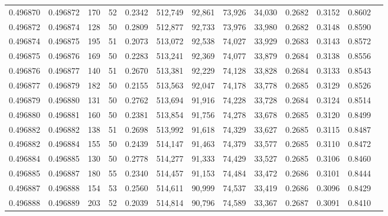 \begin{tabular}{rrrrrrrrrrrrr}
0.496870 & 0.496872 &   170 &  52 &                                     0.2342 & 512,749 &  92,861 &  73,926 &  34,030 & 0.2682 & 0.3152 & 0.8602 \\
0.496872 & 0.496874 &   128 &  50 &                                     0.2809 & 512,877 &  92,733 &  73,976 &  33,980 & 0.2682 & 0.3148 & 0.8590 \\
0.496874 & 0.496875 &   195 &  51 &                                     0.2073 & 513,072 &  92,538 &  74,027 &  33,929 & 0.2683 & 0.3143 & 0.8572 \\
0.496875 & 0.496876 &   169 &  50 &                                     0.2283 & 513,241 &  92,369 &  74,077 &  33,879 & 0.2684 & 0.3138 & 0.8556 \\
0.496876 & 0.496877 &   140 &  51 &                                     0.2670 & 513,381 &  92,229 &  74,128 &  33,828 & 0.2684 & 0.3133 & 0.8543 \\
0.496877 & 0.496879 &   182 &  50 &                                     0.2155 & 513,563 &  92,047 &  74,178 &  33,778 & 0.2685 & 0.3129 & 0.8526 \\
0.496879 & 0.496880 &   131 &  50 &                                     0.2762 & 513,694 &  91,916 &  74,228 &  33,728 & 0.2684 & 0.3124 & 0.8514 \\
0.496880 & 0.496881 &   160 &  50 &                                     0.2381 & 513,854 &  91,756 &  74,278 &  33,678 & 0.2685 & 0.3120 & 0.8499 \\
0.496882 & 0.496882 &   138 &  51 &                                     0.2698 & 513,992 &  91,618 &  74,329 &  33,627 & 0.2685 & 0.3115 & 0.8487 \\
0.496882 & 0.496884 &   155 &  50 &                                     0.2439 & 514,147 &  91,463 &  74,379 &  33,577 & 0.2685 & 0.3110 & 0.8472 \\
0.496884 & 0.496885 &   130 &  50 &                                     0.2778 & 514,277 &  91,333 &  74,429 &  33,527 & 0.2685 & 0.3106 & 0.8460 \\
0.496885 & 0.496887 &   180 &  55 &                                     0.2340 & 514,457 &  91,153 &  74,484 &  33,472 & 0.2686 & 0.3101 & 0.8444 \\
0.496887 & 0.496888 &   154 &  53 &                                     0.2560 & 514,611 &  90,999 &  74,537 &  33,419 & 0.2686 & 0.3096 & 0.8429 \\
0.496888 & 0.496889 &   203 &  52 &                                     0.2039 & 514,814 &  90,796 &  74,589 &  33,367 & 0.2687 & 0.3091 & 0.8410 \\

\end{tabular}
